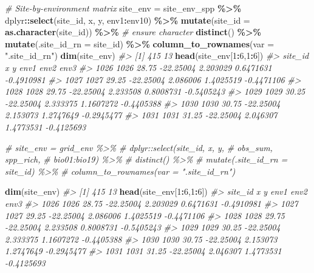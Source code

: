 \documentclass[
]{article}
\newenvironment{Shaded}{\begin{snugshade}}{\end{snugshade}}
\newcommand{\AttributeTok}[1]{\textcolor[rgb]{0.13,0.29,0.53}{#1}}
\newcommand{\CommentTok}[1]{\textcolor[rgb]{0.56,0.35,0.01}{\textit{#1}}}
\newcommand{\DecValTok}[1]{\textcolor[rgb]{0.00,0.00,0.81}{#1}}
\newcommand{\FunctionTok}[1]{\textcolor[rgb]{0.13,0.29,0.53}{\textbf{#1}}}
\newcommand{\NormalTok}[1]{#1}
\newcommand{\OtherTok}[1]{\textcolor[rgb]{0.56,0.35,0.01}{#1}}
\newcommand{\SpecialCharTok}[1]{\textcolor[rgb]{0.81,0.36,0.00}{\textbf{#1}}}
\newcommand{\StringTok}[1]{\textcolor[rgb]{0.31,0.60,0.02}{#1}}
\begin{document}
\begin{Shaded}
\begin{Highlighting}[]
\CommentTok{\# Site{-}by{-}environment matrix}
\NormalTok{site\_env }\OtherTok{=}\NormalTok{ site\_env\_spp }\SpecialCharTok{\%\textgreater{}\%}
\NormalTok{  dplyr}\SpecialCharTok{::}\FunctionTok{select}\NormalTok{(site\_id, x, y,}
\NormalTok{                env1}\SpecialCharTok{:}\NormalTok{env10) }\SpecialCharTok{\%\textgreater{}\%}
  \FunctionTok{mutate}\NormalTok{(}\AttributeTok{site\_id =} \FunctionTok{as.character}\NormalTok{(site\_id)) }\SpecialCharTok{\%\textgreater{}\%}  \CommentTok{\# ensure character}
  \FunctionTok{distinct}\NormalTok{() }\SpecialCharTok{\%\textgreater{}\%}
  \FunctionTok{mutate}\NormalTok{(}\AttributeTok{.site\_id\_rn =}\NormalTok{ site\_id) }\SpecialCharTok{\%\textgreater{}\%}
  \FunctionTok{column\_to\_rownames}\NormalTok{(}\AttributeTok{var =} \StringTok{".site\_id\_rn"}\NormalTok{)}
\FunctionTok{dim}\NormalTok{(site\_env)}
\CommentTok{\#\textgreater{} [1] 415  13}
\FunctionTok{head}\NormalTok{(site\_env[}\DecValTok{1}\SpecialCharTok{:}\DecValTok{6}\NormalTok{,}\DecValTok{1}\SpecialCharTok{:}\DecValTok{6}\NormalTok{])}
\CommentTok{\#\textgreater{}      site\_id     x         y     env1      env2       env3}
\CommentTok{\#\textgreater{} 1026    1026 28.75 {-}22.25004 2.203029 0.6471631 {-}0.4910981}
\CommentTok{\#\textgreater{} 1027    1027 29.25 {-}22.25004 2.086006 1.4025519 {-}0.4471106}
\CommentTok{\#\textgreater{} 1028    1028 29.75 {-}22.25004 2.233508 0.8008731 {-}0.5405243}
\CommentTok{\#\textgreater{} 1029    1029 30.25 {-}22.25004 2.333375 1.1607272 {-}0.4405388}
\CommentTok{\#\textgreater{} 1030    1030 30.75 {-}22.25004 2.153073 1.2747649 {-}0.2945477}
\CommentTok{\#\textgreater{} 1031    1031 31.25 {-}22.25004 2.046307 1.4773531 {-}0.4125693}

\CommentTok{\# site\_env = grid\_env \%\textgreater{}\%}
\CommentTok{\#   dplyr::select(site\_id, x, y, }
\CommentTok{\#                 obs\_sum, spp\_rich, }
\CommentTok{\#                 bio01:bio19) \%\textgreater{}\%}
\CommentTok{\#   distinct() \%\textgreater{}\%}
\CommentTok{\#   mutate(.site\_id\_rn = site\_id) \%\textgreater{}\%}
\CommentTok{\#   column\_to\_rownames(var = ".site\_id\_rn")}

\FunctionTok{dim}\NormalTok{(site\_env)}
\CommentTok{\#\textgreater{} [1] 415  13}
\FunctionTok{head}\NormalTok{(site\_env[}\DecValTok{1}\SpecialCharTok{:}\DecValTok{6}\NormalTok{,}\DecValTok{1}\SpecialCharTok{:}\DecValTok{6}\NormalTok{])}
\CommentTok{\#\textgreater{}      site\_id     x         y     env1      env2       env3}
\CommentTok{\#\textgreater{} 1026    1026 28.75 {-}22.25004 2.203029 0.6471631 {-}0.4910981}
\CommentTok{\#\textgreater{} 1027    1027 29.25 {-}22.25004 2.086006 1.4025519 {-}0.4471106}
\CommentTok{\#\textgreater{} 1028    1028 29.75 {-}22.25004 2.233508 0.8008731 {-}0.5405243}
\CommentTok{\#\textgreater{} 1029    1029 30.25 {-}22.25004 2.333375 1.1607272 {-}0.4405388}
\CommentTok{\#\textgreater{} 1030    1030 30.75 {-}22.25004 2.153073 1.2747649 {-}0.2945477}
\CommentTok{\#\textgreater{} 1031    1031 31.25 {-}22.25004 2.046307 1.4773531 {-}0.4125693}
\end{Highlighting}
\end{Shaded}
\end{document}

